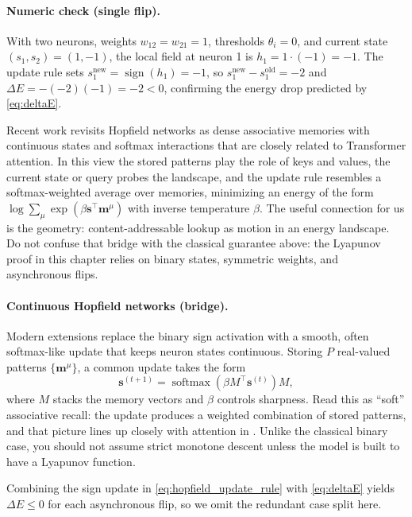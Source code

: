 \paragraph{Numeric check (single flip).} With two neurons, weights \(w_{12}=w_{21}=1\), thresholds \( \theta_i=0\), and current state \((s_1, s_2) = (1,-1)\), the local field at neuron 1 is \(h_1 = 1\cdot (-1) = -1\). The update rule sets \(s_1^{\text{new}} = \operatorname{sign}(h_1) = -1\), so \(s_1^{\text{new}} - s_1^{\text{old}} = -2\) and \(\Delta E = -(-2)(-1) = -2 < 0\), confirming the energy drop predicted by \eqref{eq:deltaE}.
\begin{tcolorbox}[summarybox, title={Modern Hopfield views and attention}]
Recent work \citep{Krotov2016,Krotov2020,Ramsauer2021} revisits Hopfield networks as dense
associative memories with continuous states and softmax interactions that are closely related to
Transformer attention. In this view the stored patterns play the role of keys and values, the
current state or query probes the landscape, and the update rule resembles a softmax-weighted
average over memories, minimizing an energy of the form \(\log \sum_\mu \exp(\beta \mathbf{s}^\top \mathbf{m}^\mu)\) with inverse temperature \(\beta\). The useful connection for us is the geometry: content-addressable lookup as motion in an energy landscape. Do not confuse that bridge with the classical guarantee above: the Lyapunov proof in this chapter relies on binary states, symmetric weights, and asynchronous flips.
\end{tcolorbox}

\paragraph{Continuous Hopfield networks (bridge).}
Modern extensions replace the binary sign activation with a smooth, often softmax-like update that keeps neuron states continuous. Storing \(P\) real-valued patterns \(\{\mathbf{m}^\mu\}\), a common update takes the form
\[
\mathbf{s}^{(t+1)} = \operatorname{softmax}\!\left(\beta M^\top \mathbf{s}^{(t)}\right) M,
\]
where \(M\) stacks the memory vectors and \(\beta\) controls sharpness. Read this as ``soft'' associative recall: the update produces a weighted combination of stored patterns, and that picture lines up closely with attention in . Unlike the classical binary case, you should not assume strict monotone descent unless the model is built to have a Lyapunov function.

Combining the sign update in \eqref{eq:hopfield_update_rule} with \eqref{eq:deltaE} yields \(\Delta E \le 0\) for each asynchronous flip, so we omit the redundant case split here.

